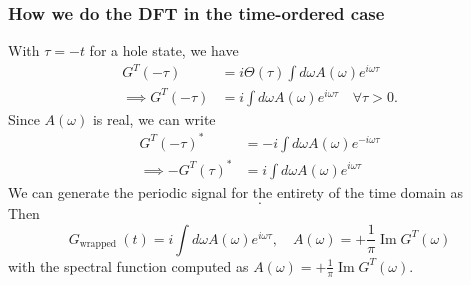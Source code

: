 \begin{frame}
    \frametitle{How we do the DFT in the time-ordered case}
With $\tau=-t$ for a hole state, we have
\begin{align}
G^T(-\tau) &= i \Theta(\tau) \int d \omega A(\omega) e^{i \omega \tau}\\
\implies G^T(-\tau) &= i \int d \omega A(\omega) e^{i \omega \tau}\quad\forall \tau>0.
\end{align}\pause
Since $A(\omega)$ is real, we can write
\begin{align}
    G^T(-\tau)^*&=-i \int d \omega A(\omega) e^{-i \omega \tau}\\
\implies -G^T(\tau)^*&=i \int d \omega A(\omega) e^{i \omega \tau}
\end{align}\pause
We can generate the periodic signal for the entirety of the time domain as
\begin{equation}
    [G^T(0), G^T(d\tau), \ldots, G^T(N d\tau), -G^T(-N d\tau)^*, \ldots, -G^T(-d\tau)^*].
\end{equation}\pause
Then 
\begin{equation}
    G_{\text {wrapped }}(t)=i \int d \omega A(\omega) e^{i\omega\tau}, \quad A(\omega) = +\frac{1}{\pi} \operatorname{Im} G^T(\omega)
\end{equation}
with the spectral function computed as $A(\omega) = +\frac{1}{\pi} \operatorname{Im} G^T(\omega)$.
\end{frame}

